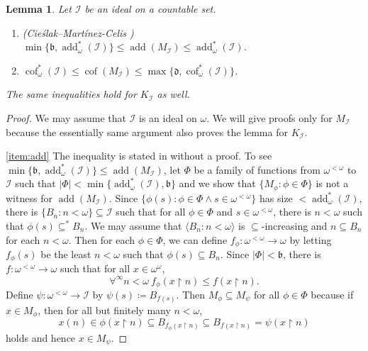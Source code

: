 \documentclass[a4paper,12pt]{amsart}
\newtheorem{lem}[thm]{Lemma}
\theoremstyle{definition}
\numberwithin{thm}{section}
\numberwithin{equation}{section}
\newcommand{\bb}{\mathfrak{b}}
\newcommand{\dd}{\mathfrak{d}}
\DeclareMathOperator{\add}{add}
\DeclareMathOperator{\cof}{cof}
\newcommand{\I}{\mathscr{I}}
\renewcommand{\subset}{\subseteq}
\begin{document}
    \begin{lem}\label{lem:add_cof_ineq}
        Let $\I$ be an ideal on a countable set.
        \begin{enumerate}
            \item \textnormal{(Cieślak--Martínez-Celis \cite[Proposition 3.6, Theorem 4.2]{CM25})}\\
            $\min\{\bb, \add^*_\omega(\I)\}\leq\add(M_\I)\leq\add^*_\omega(\I)$. \label{item:add} 
            \item $\cof^*_\omega(\I)\leq\cof(M_\I)\leq\max\{\dd, \cof^*_\omega(\I)\}$.\label{item:cof} 
        \end{enumerate}
        The same inequalities hold for $K_\I$ as well.
    \end{lem}
    \begin{proof}
        We may assume that $\I$ is an ideal on $\omega$. We will give proofs only for $M_\I$ because the essentially same argument also proves the lemma for $K_\I$.
        
        \eqref{item:add} The inequality is stated in \cite[Proposition 3.6 \& Theorem 4.2]{CM25} without a proof. To see $\min\{\bb, \add^*_\omega(\I)\}\leq\add(M_\I)$, let $\Phi$ be a family of functions from $\omega^{<\omega}$ to $\I$ such that $\lvert\Phi\rvert<\min\{\add^*_\omega(\I),\bb\}$ and we show that $\{M_\phi\colon\phi\in\Phi\}$ is not a witness for $\add(M_\I)$. Since $\{\phi(s):\phi\in\Phi\land s\in\omega^{<\omega}\}$ has size $<\add^*_\omega(\I)$, there is $\{B_n:n<\omega\}\subset\I$ such that for all $\phi\in\Phi$ and $s\in\omega^{<\omega}$, there is $n<\omega$ such that $\phi(s)\subset^* B_n$. We may assume that $\langle B_n:n<\omega\rangle$ is $\subset$-increasing and $n\subset B_n$ for each $n<\omega$. Then for each $\phi\in\Phi$, we can define $f_\phi\colon\omega^{<\omega}\to\omega$ by letting $f_\phi(s)$ be the least $n<\omega$ such that $\phi(s)\subset B_n$. Since $\lvert\Phi\rvert<\bb$, there is $f\colon\omega^{<\omega}\to\omega$ such that for all $x\in\omega^\omega$, 
        \[
        \forall^\infty n<\omega~f_\phi(x\upharpoonright n)\leq f(x\upharpoonright n).
        \]
        Define $\psi\colon\omega^{<\omega}\to\I$ by $\psi(s)\coloneqq B_{f(s)}$. Then $M_\phi\subset M_{\psi}$ for all $\phi\in\Phi$ because if $x\in M_\phi$, then for all but finitely many $n<\omega$,
        \[
        x(n)\in\phi(x\upharpoonright n)\subset B_{f_\phi(x\upharpoonright n)}\subset B_{f(x\upharpoonright n)} = \psi(x\upharpoonright n)
        \]
        holds and hence $x\in M_{\psi}$.
        

\end{proof}
\end{document}
